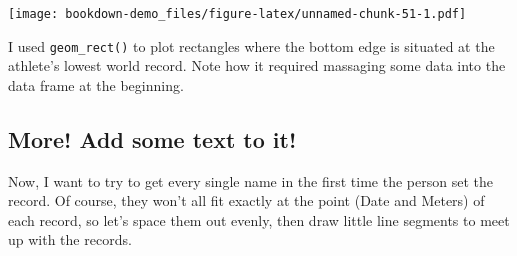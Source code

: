 \documentclass[]{book}
\theoremstyle{definition}
\theoremstyle{definition}
\theoremstyle{remark}
\begin{document}
\texttt{[image: bookdown-demo\_files/figure-latex/unnamed-chunk-51-1.pdf]}

I used \texttt{geom\_rect()} to plot rectangles where the bottom edge is
situated at the athlete's lowest world record. Note how it required
massaging some data into the data frame at the beginning.

\subsection{More! Add some text to it!}\label{more-add-some-text-to-it}

Now, I want to try to get every single name in the first time the person
set the record. Of course, they won't all fit exactly at the point (Date
and Meters) of each record, so let's space them out evenly, then draw
little line segments to meet up with the records.
\end{document}
